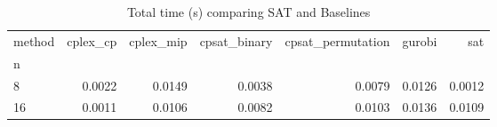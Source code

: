\begin{table}
\caption{Total time (s) comparing SAT and Baselines}
\begin{tabular}{lrrrrrr}
\toprule
method & cplex_cp & cplex_mip & cpsat_binary & cpsat_permutation & gurobi & sat \\
n &  &  &  &  &  &  \\
\midrule
8 & 0.0022 & 0.0149 & 0.0038 & 0.0079 & 0.0126 & 0.0012 \\
16 & 0.0011 & 0.0106 & 0.0082 & 0.0103 & 0.0136 & 0.0109 \\
\bottomrule
\end{tabular}
\end{table}
